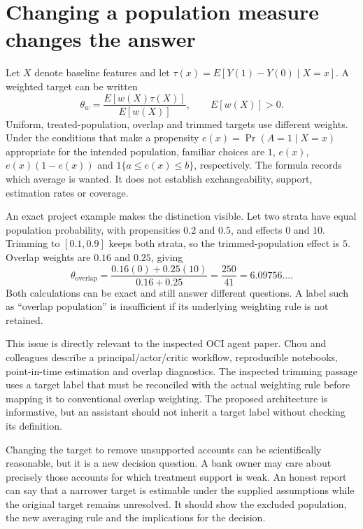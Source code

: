 \section{Changing a population measure changes the answer}

Let \(X\) denote baseline features and let
\(\tau(x)=E[Y(1)-Y(0)\mid X=x]\). A weighted target can be written
\begin{equation}
 \theta_w=\frac{E[w(X)\tau(X)]}{E[w(X)]},\qquad E[w(X)]>0.
 \label{la:weighted-target}
\end{equation}
Uniform, treated-population, overlap and trimmed targets use different
weights. Under the conditions that make a propensity \(e(x)=\Pr(A=1\mid X=x)\)
appropriate for the intended population, familiar choices are \(1\),
\(e(x)\), \(e(x)(1-e(x))\) and
\(1\{a\leq e(x)\leq b\}\), respectively. The formula records which average
is wanted. It does not establish exchangeability, support, estimation rates
or coverage.

An exact project example makes the distinction visible. Let two strata have
equal population probability, with propensities \(0.2\) and \(0.5\), and
effects \(0\) and \(10\). Trimming to \([0.1,0.9]\) keeps both strata, so
the trimmed-population effect is \(5\). Overlap weights are \(0.16\) and
\(0.25\), giving
\[
 \theta_{\mathrm{overlap}}=
 \frac{0.16(0)+0.25(10)}{0.16+0.25}=\frac{250}{41}
 =6.09756\ldots.
\]
Both calculations can be exact and still answer different questions. A label
such as ``overlap population'' is insufficient if its underlying weighting
rule is not retained.

This issue is directly relevant to the inspected OCI agent paper. Chou and
colleagues describe a principal/actor/critic workflow, reproducible notebooks,
point-in-time estimation and overlap diagnostics. The inspected trimming
passage uses a target label that must be reconciled with the actual weighting
rule before mapping it to conventional overlap weighting. The proposed
architecture is informative, but an assistant should not inherit a target
label without checking its definition. \citep{v12_la_2607_22443}

Changing the target to remove unsupported accounts can be scientifically
reasonable, but it is a new decision question. A bank owner may care about
precisely those accounts for which treatment support is weak. An honest report
can say that a narrower target is estimable under the supplied assumptions
while the original target remains unresolved. It should show the excluded
population, the new averaging rule and the implications for the decision.


